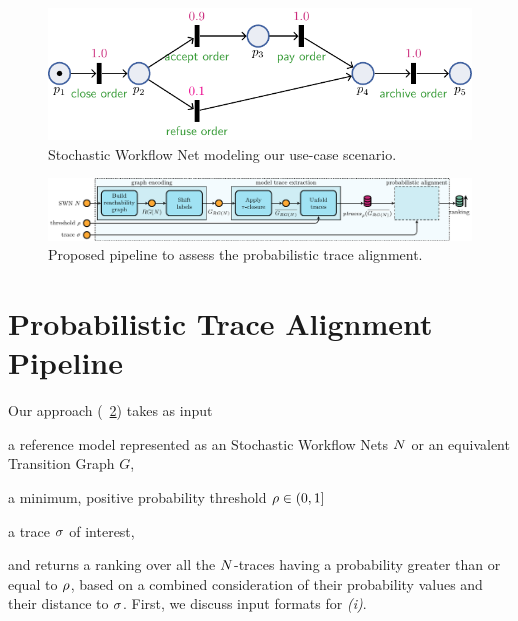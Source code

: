 \begin{figure}[!t]
	\centering
	\includegraphics[width=.45\textwidth]{images/petri_tut.pdf}
	\caption{Stochastic Workflow Net modeling our use-case scenario.}\label{fig:petri_tut}
\end{figure}
\begin{figure}[!t]
	\centering\includegraphics[width=.8\textwidth]{images/pipeline}
	\caption{Proposed pipeline to assess the probabilistic trace alignment.}\label{fig:pipe}
\end{figure}
\medskip

\section{Probabilistic Trace Alignment Pipeline}
Our approach (\figurename~\ref{fig:pipe}) takes as input
\begin{inparaenum}[\it (i)]
	\item a reference model represented as an Stochastic Workflow Nets $N$ or an equivalent Transition Graph $G$,
	\item a minimum, positive probability threshold $\rho \in (0,1]$
	\item a trace $\sigma$ of interest,
\end{inparaenum}
and returns a ranking over all the $N$-traces having a probability greater than or equal to $\rho$, based on a combined consideration of their probability values and their distance to $\sigma$. First, we discuss input formats for \textit{(i)}.




